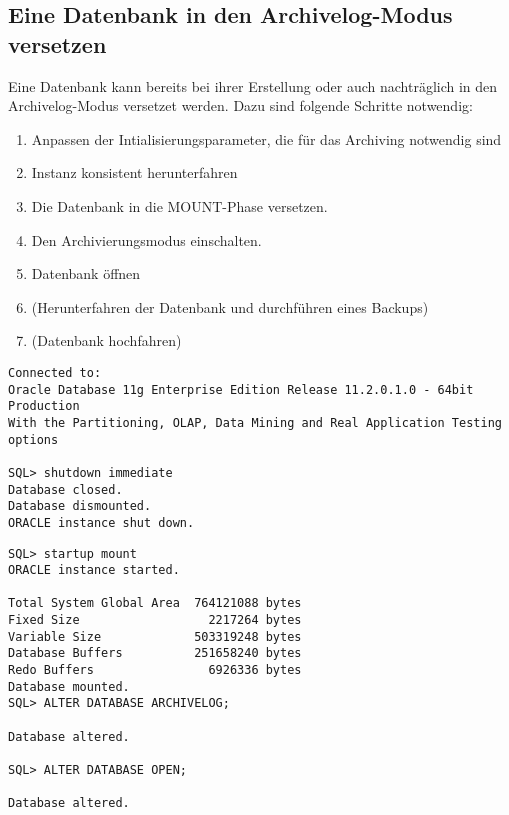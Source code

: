       \subsection{Eine Datenbank in den Archivelog-Modus versetzen}
        Eine Datenbank kann bereits bei ihrer Erstellung oder auch nachträglich in den Archivelog-Modus versetzet werden. Dazu sind folgende Schritte notwendig:
        \begin{enumerate}
          \item Anpassen der Intialisierungsparameter, die für das Archiving notwendig sind
          \item Instanz konsistent herunterfahren
          \item Die Datenbank in die MOUNT-Phase versetzen.
          \item Den Archivierungsmodus einschalten.
          \item Datenbank öffnen
          \item (Herunterfahren der Datenbank und durchführen eines Backups)
          \item (Datenbank hochfahren)
        \end{enumerate}
        \begin{lstlisting}[caption={Archivelog-Modus
        aktivieren},label=admin52,language=oracle_sql,alsolanguage=sqlplus] Connected to:
Oracle Database 11g Enterprise Edition Release 11.2.0.1.0 - 64bit Production
With the Partitioning, OLAP, Data Mining and Real Application Testing options

SQL> shutdown immediate
Database closed.
Database dismounted.
ORACLE instance shut down.
				\end{lstlisting}
\clearpage
\begin{lstlisting}[caption={Archivelog-Modus aktivieren -
Fortsetzung},label=admin52a,language=oracle_sql,alsolanguage=sqlplus]
SQL> startup mount 
ORACLE instance started.

Total System Global Area  764121088 bytes
Fixed Size                  2217264 bytes
Variable Size             503319248 bytes
Database Buffers          251658240 bytes
Redo Buffers                6926336 bytes
Database mounted.
SQL> ALTER DATABASE ARCHIVELOG;

Database altered.

SQL> ALTER DATABASE OPEN;

Database altered.
        \end{lstlisting}
